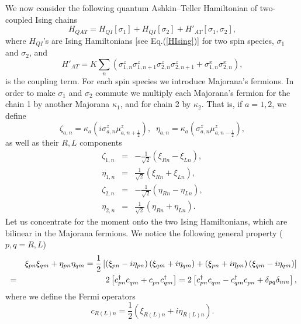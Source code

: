We now consider the following quantum Ashkin--Teller Hamiltonian
of two-coupled Ising chains
\begin{equation}
H_{QAT} = H_{QI}\left[\sigma_1\right] + H_{QI}\left[\sigma_2\right]
+H'_{AT}\left[\sigma_1,\sigma_2\right],
\label{HAskin}
\end{equation}
where $H_{QI}$'s are Ising Hamiltonians [see Eq.(\ref{HIsing})]
for two spin species, $\sigma_1$ and $\sigma_2$, and
\begin{equation}
H'_{AT} = K\sum_n \left(
\sigma^z_{1,n}\sigma^z_{1,n+1}\sigma^z_{2,n}\sigma^z_{2,n+1}
+\sigma^x_{1,n}\sigma^x_{2,n}\right),
\label{HAT}
\end{equation}
is the coupling term.
For each spin species we introduce Majorana's fermions. In
order to make $\sigma_1$ and $\sigma_2$ commute we multiply
each Majorana's fermion for the chain 1 by another Majorana
$\kappa_1$, and for chain 2 by $\kappa_2$. That is, if $a=1,2$,
we define
\begin{equation}
\zeta_{a,n} = \kappa_a \left(i\sigma^z_{a,n}\mu^z_{a,n+\frac{1}{2}}\right)
,\;\;
\eta_{a,n} = \kappa_a \left(\sigma^z_{a,n}\mu^z_{a,n-\frac{1}{2}}\right),
\label{2SM}
\end{equation}
as well as their $R,L$ components
\begin{eqnarray}
\zeta_{1,n} &=&-\frac{1}{\sqrt{2}}\left(\xi_{Rn}-\xi_{Ln}\right),\\
\eta_{1,n} &=&\frac{1}{\sqrt{2}}\left(\xi_{Rn}+\xi_{Ln}\right),\\
\zeta_{2,n} &=&-\frac{1}{\sqrt{2}}\left(\eta_{Rn}-\eta_{Ln}\right),\\
\eta_{2,n} &=&\frac{1}{\sqrt{2}}\left(\eta_{Rn}+\eta_{Ln}\right).
\end{eqnarray}
Let us concentrate for the moment onto the two Ising Hamiltonians, which
are bilinear in the Majorana fermions. We notice the following
general property ($p,q=R,L$)
\begin{eqnarray*}
&&\xi_{pn}\xi_{qm}+\eta_{pn}\eta_{qm} =
\frac{1}{2}\left[  \left(\xi_{pn}-i\eta_{pn}\right) \left(\xi_{qm}+i\eta_{qm}\right) + \left(\xi_{pn}+i\eta_{pn}\right) \left(\xi_{qm}-i\eta_{qm}\right)\right] \\
&=&
2\left[ c^\dagger_{pn}c^\pdag_{qm} + c^\pdag_{pn}c^\dagger_{qm}\right]
=2\left[ c^\dagger_{pn}c^\pdag_{qm} - c^\dagger_{qm}c^\pdag_{pn}  + \delta_{pq}\delta_{nm}\right],
\end{eqnarray*}
where we define the Fermi operators
\begin{equation}
c_{R(L)n} = \frac{1}{2}\left( \xi_{R(L)n}+i\eta_{R(L)n}\right).
\label{def:fermion}
\end{equation}
